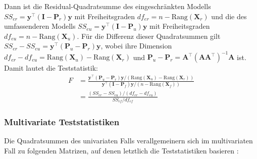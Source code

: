 Dann ist die Residual-Quadratsumme des eingeschränkten Modells $SS_{er} = \bm{y}^{\top} (\bm{I} - \bm{P}_{r}) \bm{y}$ mit Freiheitsgraden $df_{er} = n - \text{Rang}(\bm{X}_{r})$ und die des umfassenderen Modells $SS_{eu} = \bm{y}^{\top} (\bm{I} - \bm{P}_{u}) \bm{y}$ mit Freiheitsgraden $df_{eu} = n - \text{Rang}(\bm{X}_{u})$. Für die Differenz dieser Quadratsummen gilt $SS_{er} - SS_{eu} = \bm{y}^{\top} (\bm{P}_{u} - \bm{P}_{r}) \bm{y}$, wobei ihre Dimension $df_{er} - df_{eu} = \text{Rang}(\bm{X}_{u}) - \text{Rang}(\bm{X}_{r})$ und $\bm{P}_{u} - \bm{P}_{r} = \bm{A}^{\top} (\bm{A} \bm{A}^{\top})^{-1} \bm{A}$ ist. Damit lautet die Teststatistik:
\begin{align*}
F &= \frac{\bm{y}^{\top} (\bm{P}_{u} - \bm{P}_{r}) \bm{y} / (\text{Rang}(\bm{X}_{u}) - \text{Rang}(\bm{X}_{r}))}{\bm{y}^{\top} (\bm{I} - \bm{P}_{f}) \bm{y} / (n - \text{Rang}(\bm{X}_{f}))}\\[2ex]
  &= \frac{(SS_{er} - SS_{eu}) / (df_{er} - df_{eu})}{SS_{ef} / df_{ef}}
\end{align*}

\subsubsection{Multivariate Teststatistiken}

Die Quadratsummen des univariaten Falls verallgemeinern sich im multivariaten Fall zu folgenden Matrizen, auf denen letztlich die Teststatistiken basieren \cite{Fox2013}:


